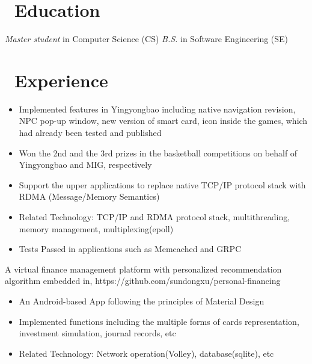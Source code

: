 \documentclass{resume}
\begin{document}
{\section{\faGraduationCap\ Education}
\textit{Master student} in Computer Science (CS)
\textit{B.S.} in Software Engineering (SE)

\section{\faUsers\ Experience}
\begin{itemize}
  \item Implemented features in Yingyongbao including native navigation revision, NPC pop-up window, new version of smart card, icon inside the games, which had already been tested and published
  \item Won the 2nd and the 3rd prizes in the basketball competitions on behalf of Yingyongbao and MIG, respectively 
\end{itemize}

\begin{itemize}
  \item Support the upper applications to replace native TCP/IP protocol stack with RDMA (Message/Memory Semantics)
  \item Related Technology: TCP/IP and RDMA protocol stack, multithreading, memory management, multiplexing(epoll)
  \item Tests Passed in applications such as Memcached and GRPC
\end{itemize}

A virtual finance management platform with personalized recommendation algorithm embedded in, https://github.com/sundongxu/personal-financing
\begin{itemize}
  \item An Android-based App following the principles of Material Design  
  \item Implemented functions including the multiple forms of cards representation, investment simulation, journal records, etc
  \item Related Technology: Network operation(Volley), database(sqlite), etc
\end{itemize}

}
\end{document}
